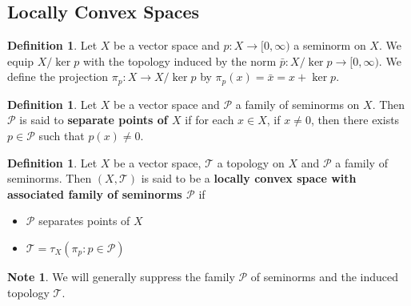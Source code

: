 \documentclass[12pt]{amsart}
\theoremstyle{definition}
\newtheorem{defn}[definition]{Definition}
\newtheorem{note}[definition]{Note}
\newcommand{\MP}{\mathcal{P}}
\newcommand{\MT}{\mathcal{T}}
\newcommand{\tbf}[1]{\textbf{#1}}
\newcommand{\Rg}{[0,\infty)}
\DeclareMathOperator*{\0}{\mbf{0}}
\DeclareMathOperator*{\1}{\mbf{1}}
\begin{document}
	

	






















	
	
	
	
	
	
	
	

	
	\newpage
	\subsection{Locally Convex Spaces}
	
	\begin{defn}
		Let $X$ be a vector space and $p:X \rightarrow [0, \infty)$ a seminorm on $X$. We equip $X / \ker p$ with the topology induced by the norm $\bar{p}:X / \ker p \rightarrow \Rg$. We define the projection $\pi_p: X \rightarrow X / \ker p$ by $\pi_p(x) = \bar{x} = x + \ker p$.
	\end{defn}
	
	\begin{defn}
		Let $X$ be a vector space and $\MP$ a family of seminorms on $X$. Then $\MP$ is said to \tbf{separate points of $X$} if for each $x \in X$, if $x \neq 0$, then there exists $p \in \MP$ such that $p(x) \neq 0$.
	\end{defn}
	
	\begin{defn}
		Let $X$ be a vector space, $\MT$ a topology on $X$ and $\MP$ a family of seminorms. Then $(X, \MT)$ is said to be a \tbf{locally convex space with associated family of seminorms $\MP$} if 
		\begin{itemize}
			\item $\MP$ separates points of $X$
			\item $\MT = \tau_X(\pi_p : p \in \MP)$
		\end{itemize} 
	\end{defn}
	
	\begin{note}
		We will generally suppress the family $\MP$ of seminorms and the induced topology $\MT$.
	\end{note}
	
\end{document}

